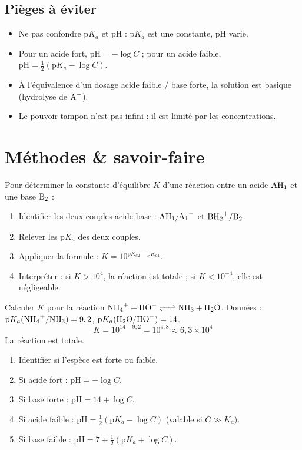 \begin{synthese}
\subsection*{Pièges à éviter}
\begin{itemize}
    \item Ne pas confondre $\mathrm{p}K_a$ et $\mathrm{pH}$ : $\mathrm{p}K_a$ est une constante, $\mathrm{pH}$ varie.
    \item Pour un acide fort, $\mathrm{pH} = -\log C$ ; pour un acide faible, $\mathrm{pH} = \frac{1}{2}(\mathrm{p}K_a - \log C)$.
    \item À l'équivalence d'un dosage acide faible / base forte, la solution est basique (hydrolyse de $\ce{A-}$).
    \item Le pouvoir tampon n'est pas infini : il est limité par les concentrations.
\end{itemize}
\end{synthese}

\section{Méthodes \& savoir-faire}

Pour déterminer la constante d'équilibre $K$ d'une réaction entre un acide $\ce{AH1}$ et une base $\ce{B2}$ :
\begin{enumerate}
    \item Identifier les deux couples acide-base : $\ce{AH1/A1-}$ et $\ce{BH2+/B2}$.
    \item Relever les $\mathrm{p}K_a$ des deux couples.
    \item Appliquer la formule : $K = 10^{\mathrm{p}K_{a2} - \mathrm{p}K_{a1}}$.
    \item Interpréter : si $K > 10^4$, la réaction est totale ; si $K < 10^{-4}$, elle est négligeable.
\end{enumerate}

\begin{exemple}
Calculer $K$ pour la réaction $\ce{NH4+ + HO- <=> NH3 + H2O}$.
Données : $\mathrm{p}K_a(\ce{NH4+/NH3}) = 9,2$, $\mathrm{p}K_a(\ce{H2O/HO-}) = 14$.
\[K = 10^{14 - 9,2} = 10^{4,8} \approx 6,3 \times 10^4\]
La réaction est totale.
\end{exemple}

\begin{enumerate}
    \item Identifier si l'espèce est forte ou faible.
    \item Si acide fort : $\mathrm{pH} = -\log C$.
    \item Si base forte : $\mathrm{pH} = 14 + \log C$.
    \item Si acide faible : $\mathrm{pH} = \frac{1}{2}(\mathrm{p}K_a - \log C)$ (valable si $C \gg K_a$).
    \item Si base faible : $\mathrm{pH} = 7 + \frac{1}{2}(\mathrm{p}K_a + \log C)$.
\end{enumerate}

